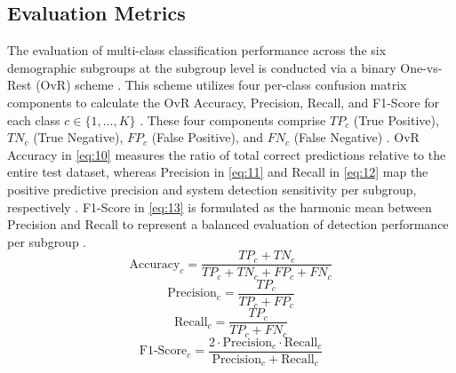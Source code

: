 \subsection{Evaluation Metrics}
\label{sec:evaluation_metrics}

The evaluation of multi-class classification performance across the six demographic subgroups at the subgroup level is conducted via a binary One-vs-Rest (OvR) scheme \cite{ref44}. This scheme utilizes four per-class confusion matrix components to calculate the OvR Accuracy, Precision, Recall, and F1-Score for each class $c \in \{1, \dots, K\}$ \cite{ref45}. These four components comprise $TP_c$ (True Positive), $TN_c$ (True Negative), $FP_c$ (False Positive), and $FN_c$ (False Negative) \cite{ref46}. OvR Accuracy in \eqref{eq:10} measures the ratio of total correct predictions relative to the entire test dataset, whereas Precision in \eqref{eq:11} and Recall in \eqref{eq:12} map the positive predictive precision and system detection sensitivity per subgroup, respectively \cite{ref47}. F1-Score in \eqref{eq:13} is formulated as the harmonic mean between Precision and Recall to represent a balanced evaluation of detection performance per subgroup \cite{ref47}.
\begin{equation}
\text{Accuracy}_c = \frac{TP_c + TN_c}{TP_c + TN_c + FP_c + FN_c}
\label{eq:10}
\end{equation}
\begin{equation}
\text{Precision}_c = \frac{TP_c}{TP_c + FP_c}
\label{eq:11}
\end{equation}
\begin{equation}
\text{Recall}_c = \frac{TP_c}{TP_c + FN_c}
\label{eq:12}
\end{equation}
\begin{equation}
\text{F1-Score}_c = \frac{2 \cdot \text{Precision}_c \cdot \text{Recall}_c}{\text{Precision}_c + \text{Recall}_c}
\label{eq:13}
\end{equation}

